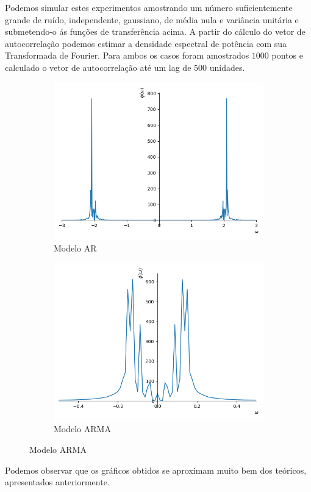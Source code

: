 \begin{enumerate}[label={\bf \alph*:},series=exerc,align=left]
    Podemos simular estes experimentos amostrando um número suficientemente grande de ruído, independente, gaussiano, de média nula e variância unitária e submetendo-o ás funções de transferência acima.
    A partir do cálculo do vetor de autocorrelação podemos estimar a densidade espectral de potência com sua Transformada de Fourier.
    Para ambos os casos foram amostrados $1000$ pontos e calculado o vetor de autocorrelação até um lag de $500$ unidades.

    \begin{figure}[h!]
        \centering
        \begin{subfigure}{0.4\textwidth}
            \includegraphics[width=\textwidth]{../img/02/PSD_AR_simulated}
            \caption{Modelo AR}
        \end{subfigure}
        \begin{subfigure}{0.4\textwidth}
            \includegraphics[width=\textwidth]{../img/02/PSD_ARMA_simulated}
            \caption{Modelo ARMA}
        \end{subfigure}
    \end{figure}

    Podemos observar que os gráficos obtidos se aproximam muito bem dos teóricos, apresentados anteriormente.
\end{enumerate}
